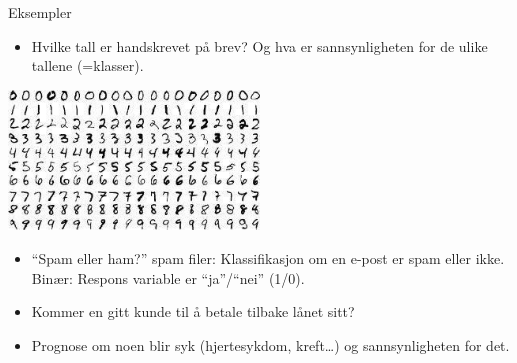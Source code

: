 \documentclass[10pt,ignorenonframetext,]{beamer}
\providecommand{\tightlist}{%
  \setlength{\itemsep}{0pt}\setlength{\parskip}{0pt}}
\begin{document}
\begin{frame}

\begin{block}{Eksempler}

\vspace{2mm}

\begin{itemize}
\tightlist
\item
  Hvilke tall er handskrevet på brev? Og hva er sannsynligheten for de
  ulike tallene (=klasser). 
\end{itemize}

\centering

\includegraphics[width=0.5\textwidth,height=\textheight]{mnist.jpeg}

\vspace{2mm}

\flushleft

\begin{itemize}
\tightlist
\item
  ``Spam eller ham?'' spam filer: Klassifikasjon om en e-post er spam
  eller ikke.\\
  Binær: Respons variable er ``ja''/``nei'' (1/0).
\end{itemize}

\vspace{2mm}

\begin{itemize}
\tightlist
\item
  Kommer en gitt kunde til å betale tilbake lånet sitt?
\end{itemize}

\vspace{2mm}

\begin{itemize}
\tightlist
\item
  Prognose om noen blir syk (hjertesykdom, kreft\ldots{}) og
  sannsynligheten for det.
\end{itemize}

\end{block}

\end{frame}
\end{document}
